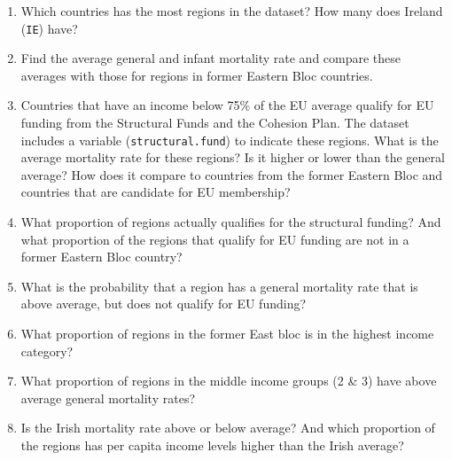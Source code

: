\documentclass{tufte-handout}
\begin{document}
\begin{enumerate}
  \item Which countries has the most regions in the dataset? How many does Ireland (\texttt{IE}) have?
  \item Find the average general and infant mortality rate and compare these averages with those for regions in former Eastern Bloc countries.
  \item Countries that have an income below 75\% of the EU average qualify for EU funding from the Structural Funds and the Cohesion Plan. The dataset includes a variable (\texttt{structural.fund}) to indicate these regions. What is the average mortality rate for these regions? Is it higher or lower than the general average? How does it compare to countries from the former Eastern Bloc and countries that are candidate for EU membership?
  
  \medskip 
  \item What proportion of regions actually qualifies for the structural funding? And what proportion of the regions that qualify for EU funding are not in a former Eastern Bloc country?

  \item What is the probability that a region has a general mortality rate that is above average, but does not qualify for EU funding?

  \item What proportion of regions in the former East bloc is in the highest income category?

  \item What proportion of regions in the middle income groups (2 \& 3) have above average general mortality rates?
  
  \item Is the Irish mortality rate above or below average? And which proportion of the regions has per capita income levels higher than the Irish average?
  
\end{enumerate}

\clearpage

\end{document}
